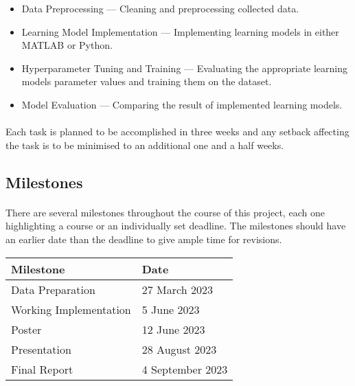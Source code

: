 \documentclass[12pt]{article}
\begin{document}
    \begin{itemize}
        \item Data Preprocessing — Cleaning and preprocessing collected data.
        \item Learning Model Implementation — Implementing learning models in either MATLAB or Python.
        \item Hyperparameter Tuning and Training — Evaluating the appropriate learning models parameter values and training them on the dataset.
        \item Model Evaluation — Comparing the result of implemented learning models.
    \end{itemize}

    \paragraph{}
    Each task is planned to be accomplished in three weeks and any setback affecting the task is to be minimised to an additional one and a half weeks.

    \subsection*{Milestones}
    \paragraph{}
    There are several milestones throughout the course of this project, each one highlighting a course or an individually set deadline. The milestones should have an earlier date than the deadline to give ample time for revisions.

    \begin{center}
    \begin{tabular}{|m m|} 
        \hline
        Milestone & Date \\
        \hline\hline
        Data Preparation & 27 March 2023 \\ 
        Working Implementation & 5 June 2023 \\
        Poster & 12 June 2023 \\
        Presentation & 28 August 2023 \\
        Final Report & 4 September 2023 \\
        \hline
    \end{tabular}
    \end{center}


{\footnotesize}
% 
\end{document}
